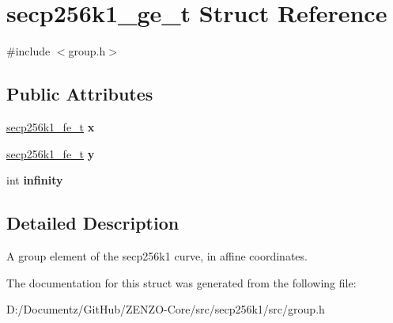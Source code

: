 \hypertarget{structsecp256k1__ge__t}{}\section{secp256k1\+\_\+ge\+\_\+t Struct Reference}
\label{structsecp256k1__ge__t}


{\ttfamily \#include $<$group.\+h$>$}

\subsection*{Public Attributes}
\begin{DoxyCompactItemize}
\item 
\mbox{\label{structsecp256k1__ge__t_a7bf7b52803edbd8ede0987e02dc6bf91}} 
\mbox{\hyperlink{structsecp256k1__fe__t}{secp256k1\+\_\+fe\+\_\+t}} {\bfseries x}
\item 
\mbox{\label{structsecp256k1__ge__t_a3f57d04d3fcf247c663dfbf0b1d95213}} 
\mbox{\hyperlink{structsecp256k1__fe__t}{secp256k1\+\_\+fe\+\_\+t}} {\bfseries y}
\item 
\mbox{\label{structsecp256k1__ge__t_ab713dc3ae3fe62ab3f82dedd77cbf34e}} 
int {\bfseries infinity}
\end{DoxyCompactItemize}


\subsection{Detailed Description}
A group element of the secp256k1 curve, in affine coordinates. 

The documentation for this struct was generated from the following file\+:\begin{DoxyCompactItemize}
\item 
D\+:/\+Documentz/\+Git\+Hub/\+Z\+E\+N\+Z\+O-\/\+Core/src/secp256k1/src/group.\+h\end{DoxyCompactItemize}
